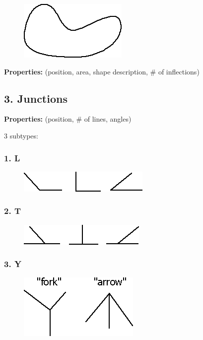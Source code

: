 \begin{figure}[H]
\centering
\includegraphics[scale=0.75, bb=0 0 197 108]{ComplexLoops.PNG}
\end{figure}

\textbf{Properties:} (position, area, shape description, \# of inflections)

\subsection{3. Junctions}

\textbf{Properties:} (position, \# of lines, angles) 

3 subtypes:

\subsubsection{1. L}

\begin{figure}[H]
\centering
\includegraphics[scale=0.7, bb=0 0 239 40]{Junctions-L.PNG}
\end{figure}

\subsubsection{2. T}

\begin{figure}[H]
\centering
\includegraphics[scale=0.7, bb=0 0 232 40]{Junctions-T.PNG}
\end{figure}

\subsubsection{3. Y }

\begin{figure}[H]
\centering
\includegraphics[scale=0.7, bb=0 0 220 118]{Junctions-Y.PNG}
\end{figure}

